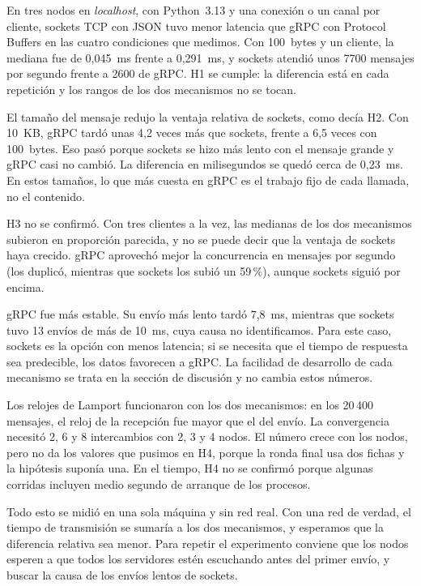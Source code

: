En tres nodos en \emph{localhost}, con Python~3.13 y una conexión o un canal por cliente, sockets TCP con JSON tuvo menor latencia que gRPC con Protocol Buffers en las cuatro condiciones que medimos. Con 100~bytes y un cliente, la mediana fue de 0,045~ms frente a 0,291~ms, y sockets atendió unos 7700 mensajes por segundo frente a 2600 de gRPC. H1 se cumple: la diferencia está en cada repetición y los rangos de los dos mecanismos no se tocan.

El tamaño del mensaje redujo la ventaja relativa de sockets, como decía H2. Con 10~KB, gRPC tardó unas 4,2 veces más que sockets, frente a 6,5 veces con 100~bytes. Eso pasó porque sockets se hizo más lento con el mensaje grande y gRPC casi no cambió. La diferencia en milisegundos se quedó cerca de 0,23~ms. En estos tamaños, lo que más cuesta en gRPC es el trabajo fijo de cada llamada, no el contenido.

H3 no se confirmó. Con tres clientes a la vez, las medianas de los dos mecanismos subieron en proporción parecida, y no se puede decir que la ventaja de sockets haya crecido. gRPC aprovechó mejor la concurrencia en mensajes por segundo (los duplicó, mientras que sockets los subió un 59\,\%), aunque sockets siguió por encima.

gRPC fue más estable. Su envío más lento tardó 7,8~ms, mientras que sockets tuvo 13 envíos de más de 10~ms, cuya causa no identificamos. Para este caso, sockets es la opción con menos latencia; si se necesita que el tiempo de respuesta sea predecible, los datos favorecen a gRPC. La facilidad de desarrollo de cada mecanismo se trata en la sección de discusión y no cambia estos números.

Los relojes de Lamport funcionaron con los dos mecanismos: en los 20\,400 mensajes, el reloj de la recepción fue mayor que el del envío. La convergencia necesitó 2, 6 y 8 intercambios con 2, 3 y 4 nodos. El número crece con los nodos, pero no da los valores que pusimos en H4, porque la ronda final usa dos fichas y la hipótesis suponía una. En el tiempo, H4 no se confirmó porque algunas corridas incluyen medio segundo de arranque de los procesos.

Todo esto se midió en una sola máquina y sin red real. Con una red de verdad, el tiempo de transmisión se sumaría a los dos mecanismos, y esperamos que la diferencia relativa sea menor. Para repetir el experimento conviene que los nodos esperen a que todos los servidores estén escuchando antes del primer envío, y buscar la causa de los envíos lentos de sockets.

